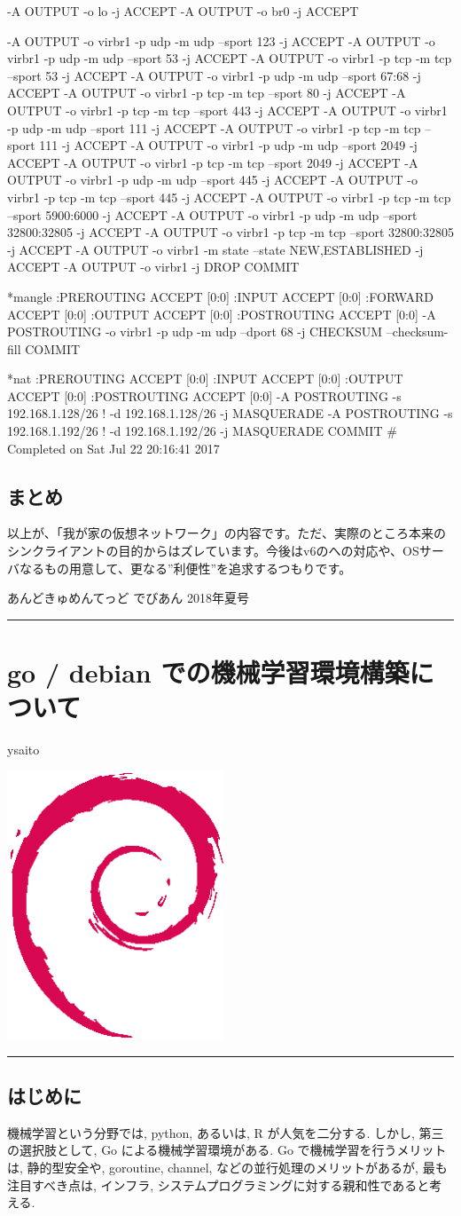 \documentclass[mingoth,a4paper]{jsarticle}
\renewcommand{\dancersection}[2]{%
\newpage
あんどきゅめんてっど でびあん 2018年夏号
%
\vspace{0.1mm}\\
{\color{dancerdarkblue}\rule{\hsize}{2mm}}

%
%
\begin{minipage}[t]{0.6\hsize}
\color{dancerdarkblue}
\vspace{1cm}
\section{#1}
\hfill{}#2\\
\end{minipage}
\begin{minipage}[t]{0.4\hsize}
\vspace{-2cm}
\hfill{}\includegraphics[height=8cm]{image200502/openlogo-nd.eps}\\
\vspace{-5cm}
\end{minipage}
%
{\color{dancerlightblue}\rule{0.66\hsize}{2mm}}
%
\vspace{2cm}
}
\begin{document}
\begin{commandline}
-A OUTPUT -o lo -j ACCEPT
-A OUTPUT -o br0 -j ACCEPT

-A OUTPUT -o virbr1 -p udp -m udp --sport 123 -j ACCEPT
-A OUTPUT -o virbr1 -p udp -m udp --sport 53 -j ACCEPT
-A OUTPUT -o virbr1 -p tcp -m tcp --sport 53 -j ACCEPT
-A OUTPUT -o virbr1 -p udp -m udp --sport 67:68 -j ACCEPT
-A OUTPUT -o virbr1 -p tcp -m tcp --sport 80 -j ACCEPT
-A OUTPUT -o virbr1 -p tcp -m tcp --sport 443 -j ACCEPT
-A OUTPUT -o virbr1 -p udp -m udp --sport 111 -j ACCEPT
-A OUTPUT -o virbr1 -p tcp -m tcp --sport 111 -j ACCEPT
-A OUTPUT -o virbr1 -p udp -m udp --sport 2049 -j ACCEPT
-A OUTPUT -o virbr1 -p tcp -m tcp --sport 2049 -j ACCEPT
-A OUTPUT -o virbr1 -p udp -m udp --sport 445 -j ACCEPT
-A OUTPUT -o virbr1 -p tcp -m tcp --sport 445 -j ACCEPT
-A OUTPUT -o virbr1 -p tcp -m tcp --sport 5900:6000 -j ACCEPT
-A OUTPUT -o virbr1 -p udp -m udp --sport 32800:32805 -j ACCEPT
-A OUTPUT -o virbr1 -p tcp -m tcp --sport 32800:32805 -j ACCEPT
-A OUTPUT -o virbr1 -m state --state NEW,ESTABLISHED -j ACCEPT
-A OUTPUT -o virbr1 -j DROP
COMMIT

*mangle
:PREROUTING ACCEPT [0:0]
:INPUT ACCEPT [0:0]
:FORWARD ACCEPT [0:0]
:OUTPUT ACCEPT [0:0]
:POSTROUTING ACCEPT [0:0]
-A POSTROUTING -o virbr1 -p udp -m udp --dport 68 -j CHECKSUM --checksum-fill
COMMIT

*nat
:PREROUTING ACCEPT [0:0]
:INPUT ACCEPT [0:0]
:OUTPUT ACCEPT [0:0]
:POSTROUTING ACCEPT [0:0]
-A POSTROUTING -s 192.168.1.128/26 ! -d 192.168.1.128/26 -j MASQUERADE
-A POSTROUTING -s 192.168.1.192/26 ! -d 192.168.1.192/26 -j MASQUERADE
COMMIT
# Completed on Sat Jul 22 20:16:41 2017
\end{commandline}

\subsection{まとめ}
以上が、「我が家の仮想ネットワーク」の内容です。ただ、実際のところ本来のシンクライアントの目的からはズレています。今後はv6のへの対応や、OSサーバなるもの用意して、更なる”利便性”を追求するつもりです。

\dancersection{go / debian での機械学習環境構築について}{ysaito}

\subsection{はじめに}
機械学習という分野では, python, あるいは, R が人気を二分する.
しかし, 第三の選択肢として, Go による機械学習環境がある.
Go で機械学習を行うメリットは, 静的型安全や, goroutine, channel, などの並行処理のメリットがあるが, 最も注目すべき点は, インフラ, システムプログラミングに対する親和性であると考える.
\end{document}
